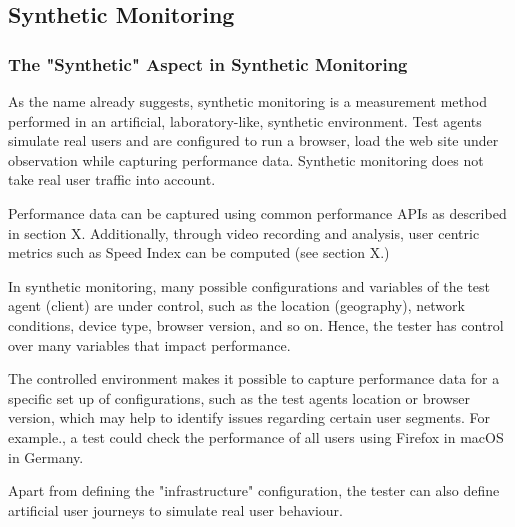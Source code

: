 


\subsection{Synthetic Monitoring}


\subsubsection{The "Synthetic" Aspect in Synthetic Monitoring}


As the name already suggests, synthetic monitoring is a measurement method performed in an artificial, laboratory-like, synthetic environment.
Test agents simulate real users and are configured to run a browser, load the web site under observation while capturing performance data.
Synthetic monitoring does not take real user traffic into account. %

Performance data can be captured using common performance APIs as described in section X.
Additionally, through video recording and analysis,  user centric metrics such as Speed Index can be computed (see section X.) %

In synthetic monitoring, many possible configurations and variables of the test agent (client) are under control, such as the location (geography), network conditions, device type, browser version, and so on. %
Hence, the tester has control over many variables that impact performance.

The controlled environment makes it possible to capture performance data for a specific set up of configurations, such as the test agents location or browser version, which may help to identify issues regarding certain user segments.  For example., a test could check the performance of all users using Firefox in macOS in Germany. %

Apart from defining the "infrastructure" configuration, the tester can also define artificial user journeys to simulate real user behaviour. %

